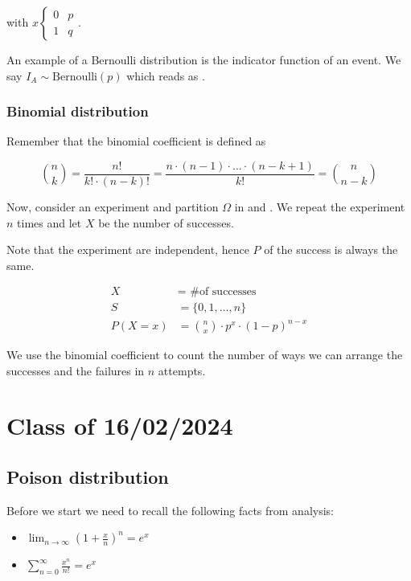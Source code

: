 \documentclass[10pt]{extarticle}
\begin{document}
with $x \begin{cases}
        0 & p \\
        1 & q
    \end{cases}$.

An example of a Bernoulli distribution is the indicator function of an event.
We say $I_A \sim \text{Bernoulli}(p)$ which reads as .

\subsubsection{Binomial distribution}

Remember that the binomial coefficient is defined as

$$
    \binom{n}{k} = \frac{n!}{k! \cdot (n - k)!} = \frac{n \cdot (n - 1) \cdot \ldots \cdot (n - k + 1)}{k!} = \binom{n}{n - k}
$$

Now, consider an experiment and partition $\Omega$ in  and .
We repeat the experiment $n$ times and let $X$ be the number of successes.

Note that the experiment are independent, hence $P$ of the success is always the same.

\begin{align*}
    X        & = \text{ \# of successes}                      \\
    S        & = \{0, 1, \ldots, n\}                          \\
    P(X = x) & = \binom{n}{x} \cdot p^x \cdot (1 - p)^{n - x}
\end{align*}

We use the binomial coefficient to count the number of ways we can arrange the successes and the failures in $n$ attempts.

\section{Class of 16/02/2024}

\subsection{Poison distribution}

Before we start we need to recall the following facts from analysis:

\begin{itemize}
    \item $\lim_{n \to \infty} \left(1 + \frac{x}{n}\right)^n = e^x$
    \item $\sum_{n=0}^\infty \frac{x^n}{n!} = e^x$
\end{itemize}
\end{document}
